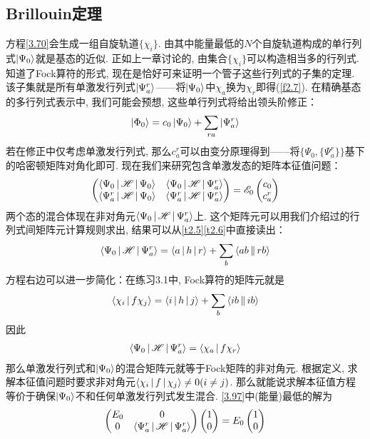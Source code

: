 \subsection{Brillouin定理}
\hft 方程\eqref{3.70}会生成一组自旋轨道$\{\chi_i\}$. 由其中能量最低的$N$个自旋轨道构成的单行列式$\Ket{\Psi_0}$就是基态的\hft 近似. 正如上一章讨论的, 由集合$\{\chi_i\}$可以构造相当多的行列式. 知道了Fock算符的形式, 现在是恰好可来证明一个管子这些行列式的子集的定理. 该子集就是所有单激发行列式$\Ket{\Psi_a^r}$——将$\Ket{\Psi_0}$中$\chi_a$换为$\chi_r$即得(\ref{f2.7}). 在精确基态的多行列式表示中, 我们可能会预想, 这些单行列式将给出领头阶修正：
\begin{align}
\Ket{\Phi_0} = c_0\Ket{\Psi_0} + \sum_{ra}\Ket{\Psi_a^r}
\end{align}
若在修正中仅考虑单激发行列式, 那么$c_a^r$可以由变分原理得到——将$\{\Psi_0,\{\Psi_a^r\}\}$基下的哈密顿矩阵对角化即可. 现在我们来研究包含单激发态的矩阵本征值问题：
\begin{align}
\label{3.97}
\begin{pmatrix}
\Braket{\Psi_0|\mathscr{H}|\Psi_0} & \Braket{\Psi_0|\mathscr{H}|\Psi_a^r}\\
\Braket{\Psi_a^r|\mathscr{H}|\Psi_0} & \Braket{\Psi_a^r|\mathscr{H}|\Psi_a^r}\\
\end{pmatrix}
=\mathscr{E}_0
\begin{pmatrix}
c_0\\
c_a^r
\end{pmatrix}
\end{align}
两个态的混合体现在非对角元$\Braket{\Psi_0|\mathscr{H}|\Psi_a^r}$上. 这个矩阵元可以用我们介绍过的行列式间矩阵元计算规则求出, 结果可以从\ref{t2.5}\ref{t2.6}中直接读出：
\begin{align}
\Braket{\Psi_0|\mathscr{H}|\Psi_a^r} = \Braket{a|h|r} + \sum_b\Braket{ab||rb}
\end{align}
方程右边可以进一步简化：在练习3.1中, Fock算符的矩阵元就是
\begin{align}
\Braket{\chi_i|f\chi_j} = \Braket{i|h|j} + \sum_b\Braket{ib||ib}
\end{align} 
因此
\begin{align}
\Braket{\Psi_0|\mathscr{H}|\Psi_a^r} = \Braket{\chi_a|f\chi_r}
\end{align}
那么单激发行列式和$\Ket{\Psi_0}$的混合矩阵元就等于Fock矩阵的非对角元. 根据定义, 求解\hft 本征值问题时要求非对角元$\Braket{\chi_i|f|\chi_j}\neq 0(i\neq j)$. 那么就能说求解\hft 本征值方程等价于确保$\Ket{\Psi_0}$不和任何单激发行列式发生混合. \eqref{3.97}中(能量)最低的解为
\begin{align}
\begin{pmatrix}
E_0 & 0\\
0   & \Braket{\Psi_a^r|\mathscr{H}|\Psi_a^r}
\end{pmatrix}
\begin{pmatrix}
1\\0
\end{pmatrix}
=E_0
\begin{pmatrix}
1\\0
\end{pmatrix}
\end{align}
